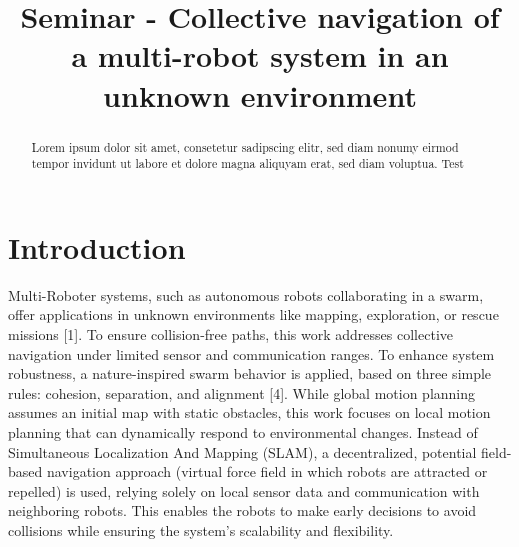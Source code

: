 \documentclass[conference]{IEEEtran}
\begin{document}
\title{Seminar - Collective navigation of a multi-robot system in an unknown environment}
\author{
}

\maketitle


\begin{abstract}
Lorem ipsum dolor sit amet, consetetur sadipscing elitr, sed diam nonumy eirmod tempor invidunt ut labore et dolore magna aliquyam erat, sed diam voluptua.
Test \cite{Olcay.2020}
\end{abstract}

\section{Introduction}
Multi-Roboter systems, such as autonomous robots collaborating in a swarm, offer 
applications in unknown environments like mapping, exploration, or rescue missions [1]. 
To ensure collision-free paths, this work addresses collective navigation under limited 
sensor and communication ranges. To enhance system robustness, a nature-inspired swarm 
behavior is applied, based on three simple rules: cohesion, separation, and alignment [4]. 
While global motion planning assumes an initial map with static obstacles, this work 
focuses on local motion planning that can dynamically respond to environmental changes. 
Instead of Simultaneous Localization And Mapping (SLAM), a decentralized, potential 
field-based navigation approach (virtual force field in which robots are attracted or repelled) 
is used, relying solely on local sensor data and communication with neighboring robots. 
This enables the robots to make early decisions to avoid collisions while ensuring the 
system's scalability and flexibility.
\end{document}
